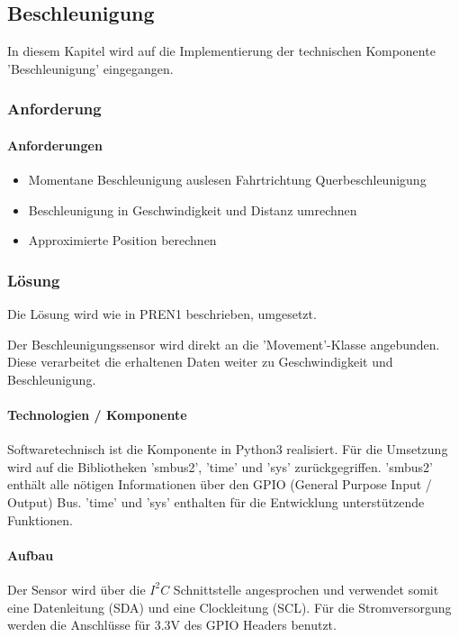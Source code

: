 \documentclass[../../main.tex]{subfiles}
\begin{document}
\subsection{Beschleunigung}
In diesem Kapitel wird auf die Implementierung der technischen Komponente 'Beschleunigung' eingegangen.
\subsubsection{Anforderung}

\paragraph{Anforderungen}
\begin{itemize}
    \item Momentane Beschleunigung auslesen
      \subitem Fahrtrichtung
      \subitem Querbeschleunigung
    \item Beschleunigung in Geschwindigkeit und Distanz umrechnen
    \item Approximierte Position berechnen
\end{itemize}

\subsubsection{Lösung}
Die Lösung wird wie in PREN1 beschrieben, umgesetzt.

Der Beschleunigungssensor wird direkt an die 'Movement'-Klasse angebunden. Diese verarbeitet die erhaltenen Daten weiter zu Geschwindigkeit und Beschleunigung.

\paragraph{Technologien / Komponente}
Softwaretechnisch ist die Komponente in Python3 realisiert. Für die Umsetzung wird auf die Bibliotheken 'smbus2', 'time' und 'sys' zurückgegriffen. 'smbus2' enthält alle nötigen Informationen über den GPIO (General Purpose Input / Output) Bus. 'time' und 'sys' enthalten für die Entwicklung unterstützende Funktionen. 

\paragraph{Aufbau}
Der Sensor wird über die $I^2C$ Schnittstelle angesprochen und verwendet somit eine Datenleitung (SDA) und eine Clockleitung (SCL). Für die Stromversorgung werden die Anschlüsse für 3.3V des GPIO Headers benutzt.
\end{document}
